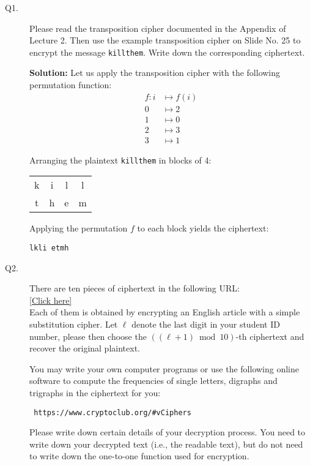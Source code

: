 \documentclass[11pt,epsfig]{article}
\begin{document}
\begin{description}


\item[Q1.] 
Please read the transposition  cipher documented in the Appendix of Lecture 2. 
Then use the example transposition cipher on Slide No. 25 to encrypt the message 
\texttt{killthem}. Write down the corresponding ciphertext.  \hfill {} 

\textbf{Solution:}
Let us apply the transposition cipher with the following permutation function:
\begin{align*}
f: i &\mapsto f(i) \\
0 &\mapsto 2 \\
1 &\mapsto 0 \\
2 &\mapsto 3 \\
3 &\mapsto 1
\end{align*}

Arranging the plaintext \texttt{killthem} in blocks of 4:
\begin{center}
\begin{tabular}{cccc}
k & i & l & l \\
t & h & e & m
\end{tabular}
\end{center}

Applying the permutation $f$ to each block yields the ciphertext:
\begin{center}
\texttt{lkli etmh}
\end{center}


\item[Q2.] 
There are ten pieces of ciphertext in the following URL:  \\
 \href{https://home.cse.ust.hk/faculty/cding/COMP5631/c685-5.html}{[Click here]} \\
 Each of them is obtained by encrypting an English article with a simple substitution 
 cipher. Let $\ell$ denote the last digit in your student ID number, please then choose the 
 $((\ell +1) \bmod{10})$-th ciphertext and recover the original plaintext. 
 
 
 You may write your own computer programs or use the following online software to compute the frequencies of single 
 letters, digraphs and trigraphs in the ciphertext for you: 
 \begin{verbatim} 
 https://www.cryptoclub.org/#vCiphers
 \end{verbatim} 
 Please write down certain details of your decryption process. You need to write down your decrypted text (i.e., 
 the readable text), but do not need to write down the one-to-one function used for encryption.    
\hfill {}


\end{description}
\end{document}
